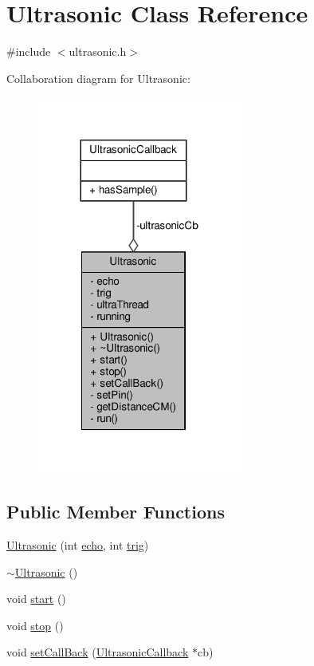 \hypertarget{classUltrasonic}{}\section{Ultrasonic Class Reference}
\label{classUltrasonic}


{\ttfamily \#include $<$ultrasonic.\+h$>$}



Collaboration diagram for Ultrasonic\+:
\nopagebreak
\begin{figure}[H]
\begin{center}
\leavevmode
\includegraphics[width=191pt]{classUltrasonic__coll__graph}
\end{center}
\end{figure}
\subsection*{Public Member Functions}
\begin{DoxyCompactItemize}
\item 
\hyperlink{classUltrasonic_a306b1ccdce9cc1bfa3ef4a51502e7d44}{Ultrasonic} (int \hyperlink{classUltrasonic_a2979ecabfbda7cae5394eef20c862d99}{echo}, int \hyperlink{classUltrasonic_a90f3f5b30f09038811bcc5231efdc619}{trig})
\item 
\hyperlink{classUltrasonic_ab5066b2bfeac723140c18b9f8340abad}{$\sim$\+Ultrasonic} ()
\item 
void \hyperlink{classUltrasonic_aa0ede289109954e5b3c713bbebe8c8e1}{start} ()
\item 
void \hyperlink{classUltrasonic_ae5d433dfce8572b5cc1d75a909ae2c1c}{stop} ()
\item 
void \hyperlink{classUltrasonic_a0b9d6fed8f4d6a207a91f19763ba70fe}{set\+Call\+Back} (\hyperlink{classUltrasonicCallback}{Ultrasonic\+Callback} $\ast$cb)
\end{DoxyCompactItemize}
